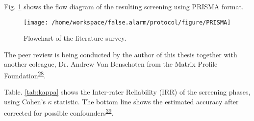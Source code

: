 \documentclass[12pt,twoside]{fmupthesis}
\begin{document}
Fig. \ref{fig:prisma} shows the flow diagram of the resulting screening using PRISMA format.
\begin{figure}

{\centering \texttt{[image: /home/workspace/false.alarm/protocol/figure/PRISMA]} 

}

\caption{Flowchart of the literature survey.}\label{fig:prisma}
\end{figure}
The peer review is being conducted by the author of this thesis together with another coleague, Dr.
Andrew Van Benschoten from the Matrix Profile Foundation\textsuperscript{\protect\hyperlink{ref-mpf2020}{28}}.

Table. \ref{tab:kappa} shows the Inter-rater Reliability (IRR) of the screening phases, using Cohen's \(\kappa\) statistic.
The bottom line shows the estimated accuracy after corrected for possible confounders\textsuperscript{\protect\hyperlink{ref-Bakeman2011}{39}}.
\end{document}
